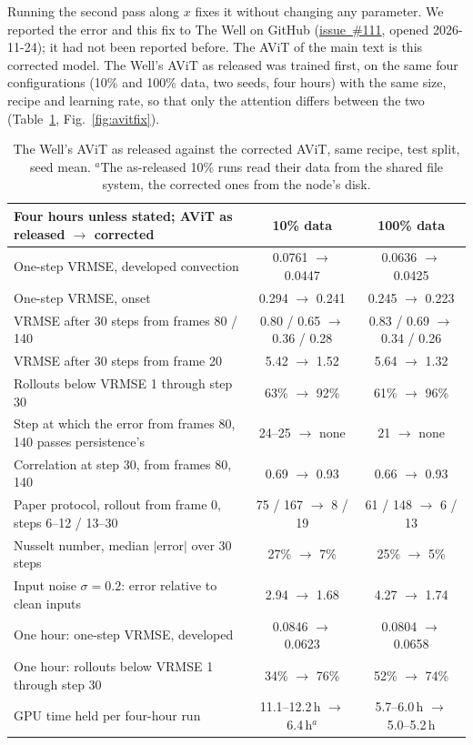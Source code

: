 \documentclass[11pt]{article}
\begin{document}
Running the second pass along $x$ fixes it without changing any parameter. We reported the error and this fix to The
Well on GitHub (\href{https://github.com/PolymathicAI/the_well/issues/111}{issue~\#111}, opened 2026-11-24); it had not been reported before. The AViT of the main text is
this corrected model. The Well's AViT as released was trained first, on the same four configurations (10\% and 100\%
data, two seeds, four hours) with the same size, recipe and learning rate, so that only the attention differs between
the two (Table~\ref{tab:avitfix}, Fig.~\ref{fig:avitfix}).

\begin{table}[tp]
\centering\footnotesize
\setlength{\tabcolsep}{5pt}
\begin{tabular}{@{}lcc@{}}
\toprule
Four hours unless stated; AViT as released $\to$ corrected & 10\% data & 100\% data \\
\midrule
One-step VRMSE, developed convection & 0.0761 $\to$ 0.0447 & 0.0636 $\to$ 0.0425 \\
One-step VRMSE, onset & 0.294 $\to$ 0.241 & 0.245 $\to$ 0.223 \\
VRMSE after 30 steps from frames 80 / 140 & 0.80 / 0.65 $\to$ 0.36 / 0.28 & 0.83 / 0.69 $\to$ 0.34 / 0.26 \\
VRMSE after 30 steps from frame 20 & 5.42 $\to$ 1.52 & 5.64 $\to$ 1.32 \\
Rollouts below VRMSE 1 through step 30 & 63\% $\to$ 92\% & 61\% $\to$ 96\% \\
Step at which the error from frames 80, 140 passes persistence's & 24--25 $\to$ none & 21 $\to$ none \\
Correlation at step 30, from frames 80, 140 & 0.69 $\to$ 0.93 & 0.66 $\to$ 0.93 \\
Paper protocol, rollout from frame 0, steps 6--12 / 13--30 & 75 / 167 $\to$ 8 / 19 & 61 / 148 $\to$ 6 / 13 \\
Nusselt number, median $|$error$|$ over 30 steps & 27\% $\to$ 7\% & 25\% $\to$ 5\% \\
Input noise $\sigma=0.2$: error relative to clean inputs & 2.94 $\to$ 1.68 & 4.27 $\to$ 1.74 \\
One hour: one-step VRMSE, developed & 0.0846 $\to$ 0.0623 & 0.0804 $\to$ 0.0658 \\
One hour: rollouts below VRMSE 1 through step 30 & 34\% $\to$ 76\% & 52\% $\to$ 74\% \\
GPU time held per four-hour run & 11.1--12.2\,h $\to$ 6.4\,h$^{a}$ & 5.7--6.0\,h $\to$ 5.0--5.2\,h \\
\bottomrule
\end{tabular}
\caption{The Well's AViT as released against the corrected AViT, same recipe, test split, seed mean.
$^{a}$The as-released 10\% runs read their data from the shared file system, the corrected ones from the node's disk.}
\label{tab:avitfix}
\end{table}
\end{document}
